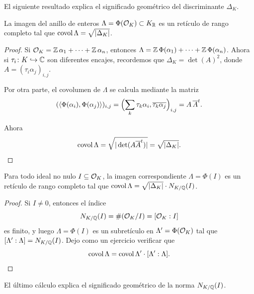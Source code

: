\vspace{1em}

El siguiente resultado explica el significado geométrico del discriminante
$\Delta_K$.

\begin{proposicion}
  La imagen del anillo de enteros $\Lambda = \Phi (\mathcal{O}_K) \subset K_{\mathbb{R}}$ es un
  retículo de rango completo tal que $\operatorname{covol} \Lambda = \sqrt{|\Delta_K|}$.

  \begin{proof}
    Si $\mathcal{O}_K = \mathbb{Z}\,\alpha_1 + \cdots + \mathbb{Z}\,\alpha_n$, entonces
    $\Lambda = \mathbb{Z}\,\Phi (\alpha_1) + \cdots + \mathbb{Z}\,\Phi (\alpha_n)$.
    Ahora si $\tau_i\colon K \hookrightarrow \mathbb{C}$ son diferentes encajes,
    recordemos que
    $\Delta_K = \det (A)^2$, donde $A = (\tau_i \alpha_j)_{i,j}$.

    Por otra parte, el covolumen de $\Lambda$ se calcula mediante la matriz
    \[ (\langle \Phi (\alpha_i), \Phi (\alpha_j)\rangle)_{i,j} =
    \Bigl(\sum_k \tau_k \alpha_i, \overline{\tau_k \alpha_j}\Bigr)_{i,j} =
    A \, \overline{A}^t. \]

    Ahora
    \[ \operatorname{covol} \Lambda = \sqrt{|\det (A \overline{A}^t)|} = \sqrt{|\Delta_K|}. \qedhere \]
  \end{proof}
\end{proposicion}

\begin{corolario}
  Para todo ideal no nulo $I \subseteq \mathcal{O}_K$, la imagen correspondiente
  $\Lambda = \Phi (I)$ es un retículo de rango completo tal que
  $\operatorname{covol} \Lambda = \sqrt{|\Delta_K|}\cdot N_{K/\mathbb{Q}} (I)$.

  \begin{proof}
    Si $I \ne 0$, entonces el índice
    $$N_{K/\mathbb{Q}} (I) = \# (\mathcal{O}_K/I) = [\mathcal{O}_K : I]$$
    es finito, y luego $\Lambda = \Phi (I)$ es un subretículo en
    $\Lambda' = \Phi (\mathcal{O}_K)$ tal que $[\Lambda' : \Lambda] = N_{K/\mathbb{Q}} (I)$.
    Dejo como un ejercicio verificar que
    \[ \operatorname{covol} \Lambda = \operatorname{covol} \Lambda' \cdot [\Lambda' : \Lambda]. \qedhere \]
  \end{proof}
\end{corolario}

El último cálculo explica el significado geométrico de la norma $N_{K/\mathbb{Q}} (I)$.

